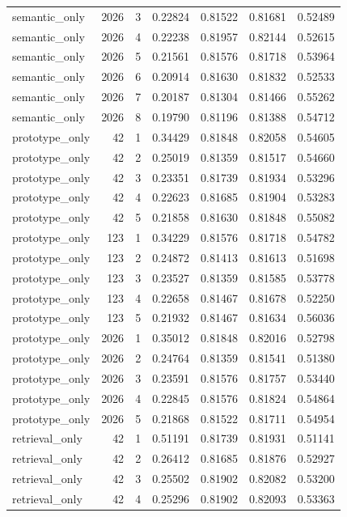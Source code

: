 \begin{tabular}{lrrrrrr}
semantic_only & 2026 & 3 & 0.22824 & 0.81522 & 0.81681 & 0.52489 \\
semantic_only & 2026 & 4 & 0.22238 & 0.81957 & 0.82144 & 0.52615 \\
semantic_only & 2026 & 5 & 0.21561 & 0.81576 & 0.81718 & 0.53964 \\
semantic_only & 2026 & 6 & 0.20914 & 0.81630 & 0.81832 & 0.52533 \\
semantic_only & 2026 & 7 & 0.20187 & 0.81304 & 0.81466 & 0.55262 \\
semantic_only & 2026 & 8 & 0.19790 & 0.81196 & 0.81388 & 0.54712 \\
prototype_only & 42 & 1 & 0.34429 & 0.81848 & 0.82058 & 0.54605 \\
prototype_only & 42 & 2 & 0.25019 & 0.81359 & 0.81517 & 0.54660 \\
prototype_only & 42 & 3 & 0.23351 & 0.81739 & 0.81934 & 0.53296 \\
prototype_only & 42 & 4 & 0.22623 & 0.81685 & 0.81904 & 0.53283 \\
prototype_only & 42 & 5 & 0.21858 & 0.81630 & 0.81848 & 0.55082 \\
prototype_only & 123 & 1 & 0.34229 & 0.81576 & 0.81718 & 0.54782 \\
prototype_only & 123 & 2 & 0.24872 & 0.81413 & 0.81613 & 0.51698 \\
prototype_only & 123 & 3 & 0.23527 & 0.81359 & 0.81585 & 0.53778 \\
prototype_only & 123 & 4 & 0.22658 & 0.81467 & 0.81678 & 0.52250 \\
prototype_only & 123 & 5 & 0.21932 & 0.81467 & 0.81634 & 0.56036 \\
prototype_only & 2026 & 1 & 0.35012 & 0.81848 & 0.82016 & 0.52798 \\
prototype_only & 2026 & 2 & 0.24764 & 0.81359 & 0.81541 & 0.51380 \\
prototype_only & 2026 & 3 & 0.23591 & 0.81576 & 0.81757 & 0.53440 \\
prototype_only & 2026 & 4 & 0.22845 & 0.81576 & 0.81824 & 0.54864 \\
prototype_only & 2026 & 5 & 0.21868 & 0.81522 & 0.81711 & 0.54954 \\
retrieval_only & 42 & 1 & 0.51191 & 0.81739 & 0.81931 & 0.51141 \\
retrieval_only & 42 & 2 & 0.26412 & 0.81685 & 0.81876 & 0.52927 \\
retrieval_only & 42 & 3 & 0.25502 & 0.81902 & 0.82082 & 0.53200 \\
retrieval_only & 42 & 4 & 0.25296 & 0.81902 & 0.82093 & 0.53363 \\

\end{tabular}
